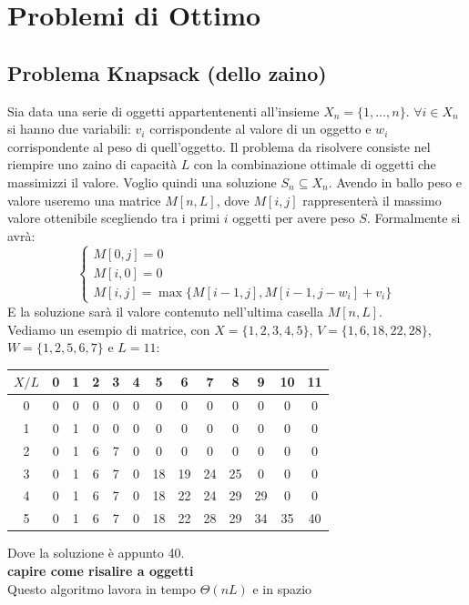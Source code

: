 \documentclass[a4paper,12pt, oneside]{book}
\begin{document}
\section{Problemi di Ottimo}
\subsection{Problema Knapsack (dello zaino)}
Sia data una serie di oggetti appartentenenti all'insieme
$X_n=\{1,\ldots, n\}$. $\forall i \in X_n$ si hanno due variabili:
$v_i$ corrispondente al valore di un oggetto e $w_i$ corrispondente al
peso di quell'oggetto. Il problema da risolvere consiste nel riempire
uno zaino di capacità $L$ con la combinazione ottimale di oggetti che
massimizzi il valore. Voglio quindi una soluzione $S_n\subseteq X_n$.
Avendo in ballo peso e valore useremo una matrice $M[n,L]$, dove
$M[i,j]$ rappresenterà il massimo valore ottenibile scegliendo tra i
primi $i$ oggetti per avere peso $S$. Formalmente si avrà:
\[
  \begin{cases}
    M[0,j]=0\\
    M[i,0]=0\\
    M[i,j]=\max\{M[i-1,j], M[i-1, j-w_i]+v_i\}
  \end{cases}
\]
E la soluzione sarà il valore contenuto nell'ultima casella
$M[n,L]$.\\
Vediamo un esempio di matrice, con $X=\{1,2,3,4,5\}$, $V=\{1,6,18,22,28\}$,
$W=\{1,2,5,6,7\}$ e $L=11$:
\begin{center}
  \begin{tabular}{c|cccccccccccc}
    $X/L$ & 0 & 1 & 2 & 3 & 4 & 5 & 6 & 7 & 8 & 9 & 10 & 11\\
    \hline
    0 & 0 & 0 & 0 & 0 & 0 & 0 & 0 & 0 & 0 & 0 & 0 & 0\\
    1 & 0 & 1 & 0 & 0 & 0 & 0 & 0 & 0 & 0 & 0 & 0 & 0\\
    2 & 0 & 1 & 6 & 7 & 0 & 0 & 0 & 0 & 0 & 0 & 0 & 0\\
    3 & 0 & 1 & 6 & 7 & 0 & 18 & 19 & 24 & 25 & 0 & 0 & 0\\
    4 & 0 & 1 & 6 & 7 & 0 & 18 & 22 & 24 & 29 & 29 & 0 & 0\\
    5 & 0 & 1 & 6 & 7 & 0 & 18 & 22 & 28 & 29 & 34 & 35 & 40\\
  \end{tabular}
\end{center}
Dove la soluzione è appunto 40.\\
\textbf{capire come risalire a oggetti}\\
Questo algoritmo lavora in tempo $\Theta(nL)$ e in spazio
\end{document}
